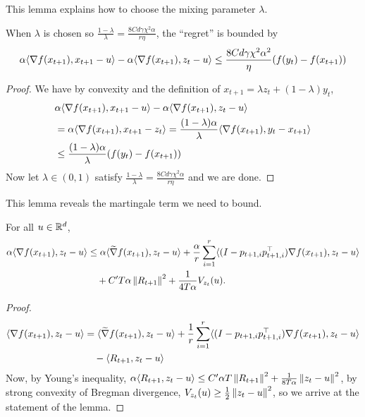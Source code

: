 This lemma explains how to choose the mixing parameter $\lambda$.
\begin{lemma}
    \label{lem:xttozt}
    When $\lambda$ is chosen so $\frac{1-\lambda}{\lambda} = \frac{8Cd \gamma \chi^2\alpha}{r\eta}$, the ``regret'' is bounded by
    \begin{align*}
        \alpha \langle \nabla f(x_{t+1}), x_{t+1} - u \rangle - \alpha \langle \nabla f(x_{t+1}), z_t - u \rangle \leq \frac{8Cd \gamma \chi^2\alpha^2}{\eta} (f(y_t) - f(x_{t+1}))
    \end{align*}
\end{lemma}
\begin{proof}
    We have by convexity and the definition of $x_{t+1} = \lambda z_t + (1-\lambda) y_t$,
    \begin{align*}
        &\alpha \langle \nabla f(x_{t+1}), x_{t+1} - u \rangle - \alpha \langle \nabla f(x_{t+1}), z_t - u \rangle \\
        &= \alpha \langle \nabla f(x_{t+1}), x_{t+1}-z_t \rangle = \frac{(1-\lambda)\alpha}{\lambda} \langle \nabla f(x_{t+1}), y_t - x_{t+1} \rangle 
        \\&\leq \frac{(1-\lambda)\alpha}{\lambda} (f(y_t) - f(x_{t+1}))
    \end{align*}
    Now let $\lambda \in (0,1)$ satisfy $\frac{1-\lambda}{\lambda} = \frac{8Cd \gamma \chi^2\alpha}{r\eta}$ and we are done.
\end{proof}
This lemma reveals the martingale term we need to bound. 
\begin{lemma} 
    \label{lem:martingale-term}
    For all $u \in \mathbb{R}^d$,
    \begin{align*}
        \alpha\langle \nabla f(x_{t+1}), z_t - u\rangle &\leq \alpha \langle \widetilde{\nabla} f(x_{t+1}), z_t - u \rangle +  \frac{\alpha}{r}\sum_{i=1}^r \langle (I- p_{t+1,i}p_{t+1,i}^\top) \nabla f(x_{t+1}), z_t - u\rangle
        \\&\quad+ C'T\alpha \left\lVert R_{t+1} \right\rVert^2 + \frac{1}{4T \alpha} V_{z_t}(u).
    \end{align*}
\end{lemma}
\begin{proof}
    \begin{align*}
        \langle \nabla f(x_{t+1}), z_t - u\rangle &= \langle \widetilde{\nabla} f(x_{t+1}), z_t - u \rangle + \frac{1}{r}\sum_{i=1}^r \langle (I- p_{t+1,i}p_{t+1,i}^\top) \nabla f(x_{t+1}), z_t - u\rangle 
        \\& \quad- \langle R_{t+1}, z_t - u \rangle
    \end{align*}
    Now, by Young's inequality, $\alpha\langle R_{t+1}, z_t - u \rangle \leq C' \alpha T \left\lVert R_{t+1} \right\rVert^2 + \frac{1}{8T \alpha} \left\lVert z_t - u \right\rVert^2$, by strong convexity of Bregman divergence, $V_{z_t}(u) \geq \frac12 \left\lVert z_t - u \right\rVert^2$, so we arrive at the statement of the lemma.
\end{proof}

